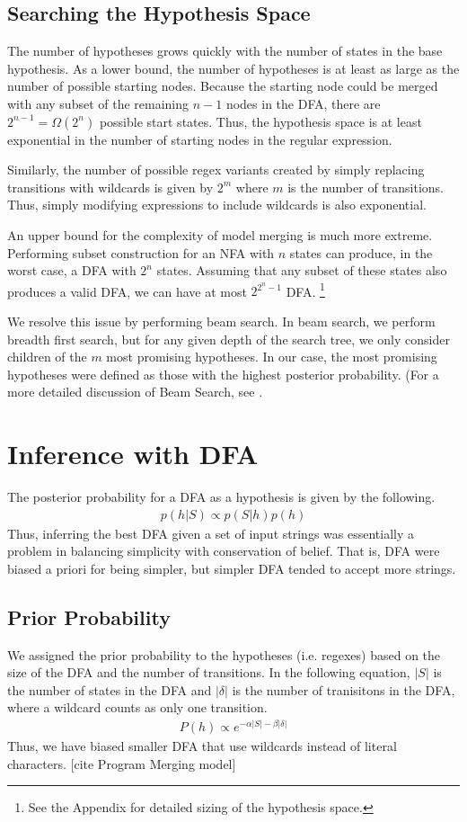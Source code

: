 \documentclass[10pt,letterpaper]{article}
\begin{document}
\subsection{Searching the Hypothesis Space} The number of hypotheses grows quickly with the number of states in the base hypothesis. As a lower bound, the number of hypotheses is at least as large as the number of possible starting nodes. Because the starting node could be merged with any subset of the remaining $n-1$ nodes in the DFA, there are $2^{n-1}=\Omega(2^n)$ possible start states. Thus, the hypothesis space is at least exponential in the number of starting nodes in the regular expression.

Similarly, the number of possible regex variants created by simply replacing transitions with wildcards is given by $2^m$ where $m$ is the number of transitions. Thus, simply modifying expressions to include wildcards is also exponential.

An upper bound for the complexity of model merging is much more extreme. Performing subset construction for an NFA with $n$ states can produce, in the worst case, a DFA with $2^n$ states. Assuming that any subset of these states also produces a valid DFA, we can have at most $2^{2^n-1}$ DFA. \footnote{See the Appendix for detailed sizing of the hypothesis space.}

We resolve this issue by performing beam search. In beam search, we perform breadth first search, but for any given depth of the search tree, we only consider children of the $m$ most promising hypotheses. In our case, the most promising hypotheses were defined as those with the highest posterior probability. (For a more detailed discussion of Beam Search, see \cite{HwangStuhlmullerGoodman2011}.


\section{Inference with DFA}
The posterior probability for a DFA as a hypothesis is given by the following.
\begin{align*}
	p(h|S) \propto p(S|h)p(h)
\end{align*}
Thus, inferring the best DFA given a set of input strings was essentially a problem in balancing simplicity with conservation of belief. That is, DFA were biased a priori for being simpler, but simpler DFA tended to accept more strings.

\subsection{Prior Probability}
We assigned the prior probability to the hypotheses (i.e. regexes) based on the size of the DFA and the number of transitions. In the following equation, $|S|$ is the number of states in the DFA and $|\delta|$ is the number of tranisitons in the DFA, where a wildcard counts as only one transition. 
\begin{align*}
	P(h) \propto e^{-\alpha|S| - \beta|\delta|}
\end{align*}
Thus, we have biased smaller DFA that use wildcards instead of literal characters. [cite Program Merging model]
\end{document}
